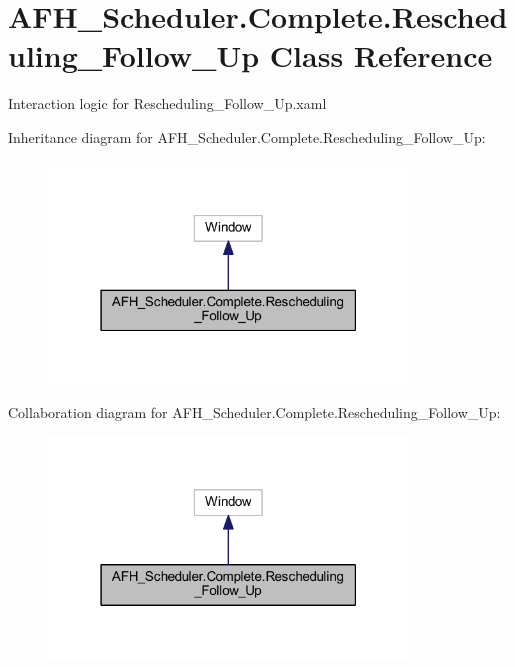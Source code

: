 \section{A\+F\+H\+\_\+\+Scheduler.\+Complete.\+Rescheduling\+\_\+\+Follow\+\_\+\+Up Class Reference}
\label{class_a_f_h___scheduler_1_1_complete_1_1_rescheduling___follow___up}


Interaction logic for Rescheduling\+\_\+\+Follow\+\_\+\+Up.\+xaml  




Inheritance diagram for A\+F\+H\+\_\+\+Scheduler.\+Complete.\+Rescheduling\+\_\+\+Follow\+\_\+\+Up\+:
\nopagebreak
\begin{figure}[H]
\begin{center}
\leavevmode
\includegraphics[width=271pt]{class_a_f_h___scheduler_1_1_complete_1_1_rescheduling___follow___up__inherit__graph}
\end{center}
\end{figure}


Collaboration diagram for A\+F\+H\+\_\+\+Scheduler.\+Complete.\+Rescheduling\+\_\+\+Follow\+\_\+\+Up\+:
\nopagebreak
\begin{figure}[H]
\begin{center}
\leavevmode
\includegraphics[width=271pt]{class_a_f_h___scheduler_1_1_complete_1_1_rescheduling___follow___up__coll__graph}
\end{center}
\end{figure}

